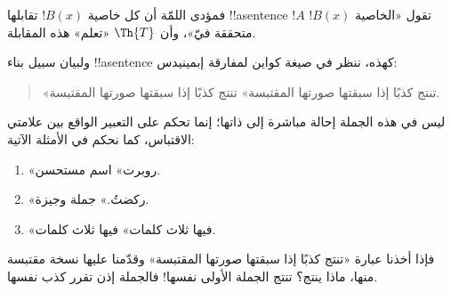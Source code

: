 \documentclass[../../../include/open-logic-section]{subfiles}
\begin{document}
فمؤدى اللمّة أن كل خاصية $!B(x)$ تقابلها !!a{sentence} $!A$
تقول «الخاصية $!B(x)$ متحققة فيّ»، وأن $\Th{T}$ «تعلم» هذه
المقابلة.

ولبيان سبيل بناء !!a{sentence} كهذه، ننظر في صيغة كواين
لمفارقة إبمينيدس:
\begin{quote}
«تنتج كذبًا إذا سبقتها صورتها المقتبسة» تنتج كذبًا إذا سبقتها صورتها
المقتبسة.
\end{quote}
ليس في هذه الجملة إحالة مباشرة إلى ذاتها؛ إنما تحكم على التعبير
الواقع بين علامتي الاقتباس، كما نحكم في الأمثلة الآتية:
\begin{enumerate}
\item «روبرت» اسم مستحسن.
\item «ركضتُ.» جملة وجيزة.
\item «فيها ثلاث كلمات» فيها ثلاث كلمات.
\end{enumerate}
فإذا أخذنا عبارة «تنتج كذبًا إذا سبقتها صورتها المقتبسة» وقدّمنا
عليها نسخة مقتبسة منها، ماذا ينتج؟ تنتج الجملة الأولى نفسها!{}
فالجملة إذن تقرر كذب نفسها.
\end{document}
